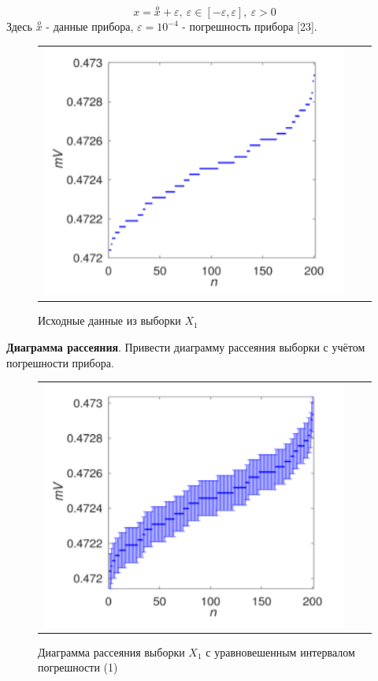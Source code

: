 \documentclass[a4paper,14pt]{article}
\begin{document}
	\begin{equation}
		x = \stackrel{o}{x} + \varepsilon, \ \varepsilon \in [-\varepsilon, \varepsilon], \ \varepsilon > 0
	\end{equation}
	Здесь $\stackrel{o}{x}$ - данные прибора, $\varepsilon = 10^{-4}$ - погрешность прибора [23].
	\begin{figure}[H]
		\begin{center}
			\begin{tabular}{ccc}
				\includegraphics[scale=0.8]{../image/problem1.png}
			\end{tabular}
		\end{center}
		\caption{Исходные данные из выборки $X_1$} 
	\end{figure}

	\textbf{Диаграмма рассеяния}. Привести диаграмму рассеяния выборки с учётом погрешности прибора.
	\begin{figure}[H]
		\begin{center}
			\begin{tabular}{ccc}
				\includegraphics[scale=0.8]{../image/problem2.png}
			\end{tabular}
		\end{center}
		\caption{Диаграмма рассеяния выборки $X_1$ с уравновешенным интервалом погрешности (1)} 
	\end{figure}
\end{document}
